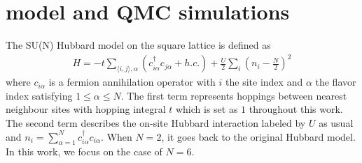 \documentclass[twocolumn,superscriptaddress,prb]{revtex4-1}
\begin{document}




\section{model and QMC simulations}
The SU(N) Hubbard model on the square lattice is defined as
\begin{eqnarray}
  H=-t\sum_{\langle i,j\rangle,\alpha}\left(c_{i\alpha}^\dag c_{j\alpha}
  +h.c.\right)+\frac{U}{2}\sum_{i}\left(n_i-\frac{N}{2}\right)^2
  \label{eq:hamilton}
\end{eqnarray}
where $c_{i\alpha}$ is a fermion annihilation operator with $i$ the site index and $\alpha$ the flavor index satisfying $1\le\alpha\le N$. The first term represents hoppings between nearest neighbour sites with hopping integral $t$ which is set as $1$ throughout this work. The second term describes the on-site Hubbard interaction labeled by $U$ as usual and $n_i=\sum_{\alpha=1}^{N} c_{i\alpha}^\dag c_{i\alpha}$. When $N=2$, it goes back to the original Hubbard model. In this work, we focus on the case of $N=6$. 
\end{document}

